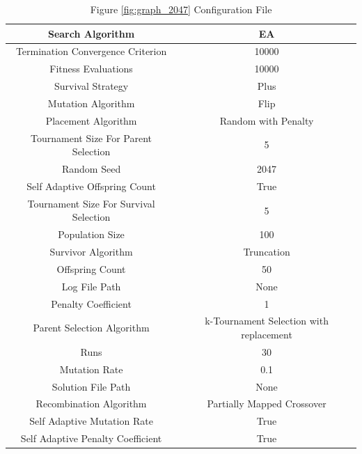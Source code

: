 \documentclass{standalone}
\begin{document}
\begin{table}[!htb]
	\centering
	\caption{Figure \ref{fig:graph_2047} Configuration File}
	\label{tab:graph_2047}
	\begin{tabular}{| c | c |}
		\hline
		Search Algorithm		& EA		 \\
		\hline
		Termination Convergence Criterion		& 10000		 \\
		\hline
		Fitness Evaluations		& 10000		 \\
		\hline
		Survival Strategy		& Plus		 \\
		\hline
		Mutation Algorithm		& Flip		 \\
		\hline
		Placement Algorithm		& Random with Penalty		 \\
		\hline
		Tournament Size For Parent Selection		& 5		 \\
		\hline
		Random Seed		& 2047		 \\
		\hline
		Self Adaptive Offspring Count		& True		 \\
		\hline
		Tournament Size For Survival Selection		& 5		 \\
		\hline
		Population Size		& 100		 \\
		\hline
		Survivor Algorithm		& Truncation		 \\
		\hline
		Offspring Count		& 50		 \\
		\hline
		Log File Path		& None		 \\
		\hline
		Penalty Coefficient		& 1		 \\
		\hline
		Parent Selection Algorithm		& k-Tournament Selection with replacement		 \\
		\hline
		Runs		& 30		 \\
		\hline
		Mutation Rate		& 0.1		 \\
		\hline
		Solution File Path		& None		 \\
		\hline
		Recombination Algorithm		& Partially Mapped Crossover		 \\
		\hline
		Self Adaptive Mutation Rate		& True		 \\
		\hline
		Self Adaptive Penalty Coefficient		& True		 \\
		\hline
	\end{tabular}
\end{table}
\end{document}
